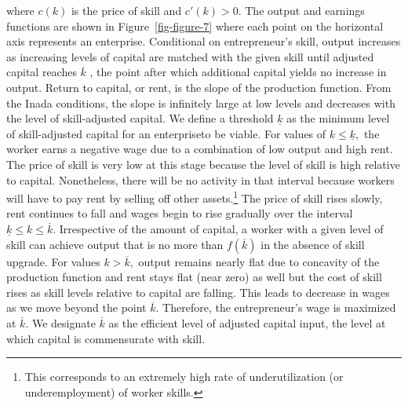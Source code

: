 \documentclass[
  a4paper,
  DIV=11,
  numbers=noendperiod]{scrartcl}
\begin{document}
where \(c(k)\) is the price of skill and \(c'(k)>0.\) The output and
earnings functions are shown in Figure~\ref{fig-figure-7} where each
point on the horizontal axis represents an enterprise. Conditional on
entrepreneur's skill, output increases as increasing levels of capital
are matched with the given skill until adjusted capital reaches
\(\overline{k}\) , the point after which additional capital yields no
increase in output. Return to capital, or rent, is the slope of the
production function. From the Inada conditions, the slope is infinitely
large at low levels and decreases with the level of skill-adjusted
capital. We define a threshold \(\underline{k}\) as the minimum level of
skill-adjusted capital for an enterpriseto be viable. For values of
\(k\le{\underline{k}},\) the worker earns a negative wage due to a
combination of low output and high rent. The price of skill is very low
at this stage because the level of skill is high relative to capital.
Nonetheless, there will be no activity in that interval because workers
will have to pay rent by selling off other assets.\footnote{This
  corresponds to an extremely high rate of underutilization (or
  underemployment) of worker skills.} The price of skill rises slowly,
rent continues to fall and wages begin to rise gradually over the
interval \(\underline{k}\le{k}\le{\overline{k}}.\) Irrespective of the
amount of capital, a worker with a given level of skill can achieve
output that is no more than \(f(\overline{k})\) in the absence of skill
upgrade. For values \(k>\overline{k},\) output remains nearly flat due
to concavity of the production function and rent stays flat (near zero)
as well but the cost of skill rises as skill levels relative to capital
are falling. This leads to decrease in wages as we move beyond the point
\(\overline{k}.\) Therefore, the entrepreneur's wage is maximized at
\(\overline{k}.\) We designate \(\overline{k}\) as the efficient level
of adjusted capital input, the level at which capital is commensurate
with skill.
\end{document}
